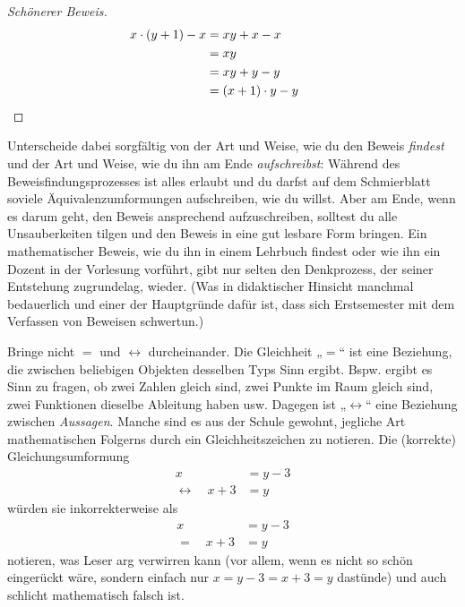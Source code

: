 \begin{bem}[„Gleichungs-U's“]
\begin{proof}[Schönerer Beweis]
\begin{align*}
            x\cdot (y+1) -x& = xy + x -x\\
            & = xy  \\
            & = xy + y - y \\
            & = (x+1)\cdot y -y  &&&& \qedhere
        \end{align*}
    \end{proof}
    Unterscheide dabei sorgfältig von der Art und Weise, wie du den Beweis \emph{findest} und der Art und Weise, wie du ihn am Ende \emph{aufschreibst}: Während des Beweisfindungsprozesses ist alles erlaubt und du darfst auf dem Schmierblatt soviele Äquivalenzumformungen aufschreiben, wie du willst. Aber am Ende, wenn es darum geht, den Beweis ansprechend aufzuschreiben, solltest du alle Unsauberkeiten tilgen und den Beweis in eine gut lesbare Form bringen. Ein mathematischer Beweis, wie du ihn in einem Lehrbuch findest oder wie ihn ein Dozent in der Vorlesung vorführt, gibt nur selten den Denkprozess, der seiner Entstehung zugrundelag, wieder. (Was in didaktischer Hinsicht manchmal bedauerlich und einer der Hauptgründe dafür ist, dass sich Erstsemester mit dem Verfassen von Beweisen schwertun.)
\end{bem}


\begin{bem}[Unterschied zwischen $=$ und $\leftrightarrow$]
    Bringe nicht $=$ und $\leftrightarrow$ durcheinander. Die Gleichheit „$=$“ ist eine Beziehung, die zwischen beliebigen Objekten desselben Typs Sinn ergibt. Bspw. ergibt es Sinn zu fragen, ob zwei Zahlen gleich sind, zwei Punkte im Raum gleich sind, zwei Funktionen dieselbe Ableitung haben usw. Dagegen ist „$\leftrightarrow$“ eine Beziehung zwischen \emph{Aussagen}. Manche sind es aus der Schule gewohnt, jegliche Art mathematischen Folgerns durch ein Gleichheitszeichen zu notieren. Die (korrekte) Gleichungsumformung
    \begin{align*}
        x & = y-3 \\
        \leftrightarrow\quad  x+3 & = y
    \end{align*}
    würden sie inkorrekterweise als
    \begin{align*}
        x & = y-3 \\
        = \quad x+3 & = y
    \end{align*}
    notieren, was Leser arg verwirren kann (vor allem, wenn es nicht so schön eingerückt wäre, sondern einfach nur $x=y-3=x+3=y$ dastünde) und auch schlicht mathematisch falsch ist.
\end{bem}



